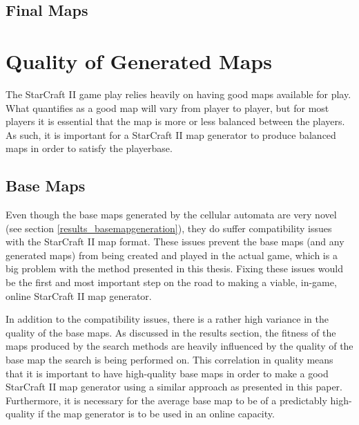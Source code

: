 \subsection{Final Maps}
\label{discussion_novelty_finalmaps}





\section{Quality of Generated Maps}
\label{discussion_quality}
The StarCraft II game play relies heavily on having good maps available for play. What quantifies as a good map will vary from player to player, but for most players it is essential that the map is more or less balanced between the players. As such, it is important for a StarCraft II map generator to produce balanced maps in order to satisfy the playerbase.

\subsection{Base Maps}
\label{discussion_quality_basemaps}
Even though the base maps generated by the cellular automata are very novel (see section \ref{results_basemapgeneration}), they do suffer compatibility issues with the StarCraft II map format. These issues prevent the base maps (and any generated maps) from being created and played in the actual game, which is a big problem with the method presented in this thesis. Fixing these issues would be the first and most important step on the road to making a viable, in-game, online StarCraft II map generator.

In addition to the compatibility issues, there is a rather high variance in the quality of the base maps. As discussed in the results section, the fitness of the maps produced by the search methods are heavily influenced by the quality of the base map the search is being performed on. This correlation in quality means that it is important to have high-quality base maps in order to make a good StarCraft II map generator using a similar approach as presented in this paper. Furthermore, it is necessary for the average base map to be of a predictably high-quality if the map generator is to be used in an online capacity. 

